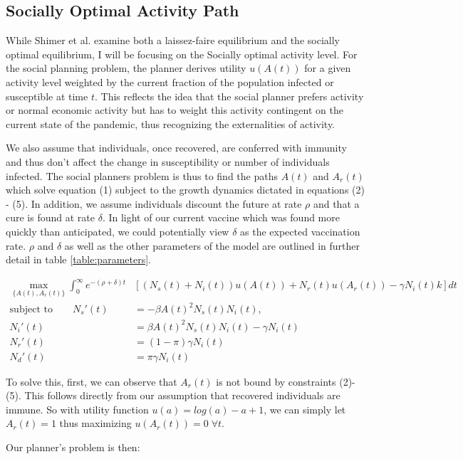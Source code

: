 \documentclass[12pt]{article}
\begin{document}
\subsection{Socially Optimal Activity Path}
While Shimer et al. examine both a laissez-faire equilibrium and the socially optimal equilibrium, I will be focusing on the Socially optimal activity level.
For the social planning problem, the planner derives utility $u(A(t))$ for a given activity level weighted by the current fraction of the population infected 
or susceptible at time $t$. This reflects the idea that the social planner prefers activity or normal economic activity but has to weight this 
activity contingent on the current state of the pandemic, thus recognizing the externalities of activity.

We also assume that individuals, once recovered, are conferred with immunity and thus don't affect the change in susceptibility or number of individuals infected. The social planners problem is thus
to find the paths $A(t)$ and $A_r(t)$ which solve equation (1) subject to the growth dynamics dictated in equations (2) - (5).
In addition, we assume individuals discount the future at rate $\rho$ and that a cure is found at rate $\delta$. In light of our current vaccine which was 
found more quickly than anticipated, we could potentially view $\delta$ as the expected vaccination rate. $\rho$ and $\delta$ as well as the other parameters of the model are outlined in further detail in table \ref{table:parameters}.

\begin{align} 
	\max_{\{A(t), A_r(t)\}} \int_0^\infty 
	e^{-(\rho + \delta)t}
	&\left[
		(N_s(t) + N_i(t)) u(A(t)) + N_r(t) u(A_r(t)) - \gamma N_i(t) k
	\right]
	dt \\
	\text{subject to} \qquad N_s'(t) &= -\beta A(t)^2 N_s(t) N_i(t), \\
			N_i' (t) &= \beta A(t)^2 N_s(t) N_i(t) - \gamma N_i(t) \\
			N_r'(t) &= (1 - \pi) \gamma N_i(t) \\
			N_d'(t) &= \pi	\gamma N_i(t)
\end{align} 

To solve this, first, we can observe that $A_r(t)$ is not bound by constraints (2)-(5). This follows directly from our assumption that recovered individuals are immune.
So with utility function  $u(a) = log(a) - a + 1$, we can simply let $A_r(t) = 1$ thus maximizing $u(A_r(t)) = 0 \; \forall t $. 

Our planner's problem is then:
\end{document}
